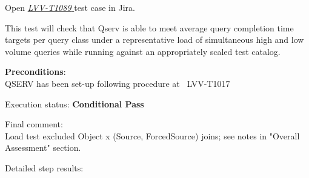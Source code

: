 \documentclass[DM,lsstdraft,STR,toc]{lsstdoc}
\begin{document}
Open  \href{https://jira.lsstcorp.org/secure/Tests.jspa#/testCase/LVV-T1089}{\textit{ LVV-T1089 } }
test case in Jira.

    This test will check that Qserv is able to meet average query completion
time targets per query class under a representative load of simultaneous
high and low volume queries while running against an appropriately
scaled test catalog.


    \textbf{ Preconditions}:\\
    QSERV has been set-up following procedure at ~LVV-T1017


    Execution status: {\bf Conditional Pass }

    Final comment:\\Load test excluded Object x (Source, ForcedSource) joins; see notes in
"Overall Assessment" section.



    Detailed step results:
\end{document}
